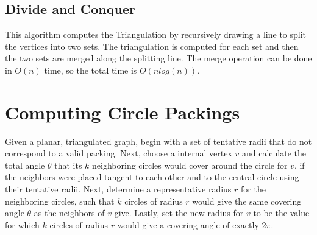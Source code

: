 \documentclass[english]{article}
\begin{document}
\subsection{Divide and Conquer}
This algorithm computes the Triangulation by recursively drawing a line to split the vertices into two sets. The triangulation is computed for each set and then the two sets are merged along the splitting line. The merge operation can be done in $O(n)$ time, so the total time is $O(nlog(n))$.

\section{Computing Circle Packings}
Given a planar, triangulated graph, begin with a set of tentative radii that do not correspond to a valid packing. Next, choose a internal vertex $v$ and calculate the total angle $\theta$ that its $k$ neighboring circles would cover around the circle for $v$, if the neighbors were placed tangent to each other and to the central circle using their tentative radii. Next, determine a representative radius $r$ for the neighboring circles, such that $k$ circles of radius $r$ would give the same covering angle $\theta$ as the neighbors of $v$ give. Lastly, set the new radius for $v$ to be the value for which $k$ circles of radius $r$ would give a covering angle of exactly $2\pi$.




\end{document}
